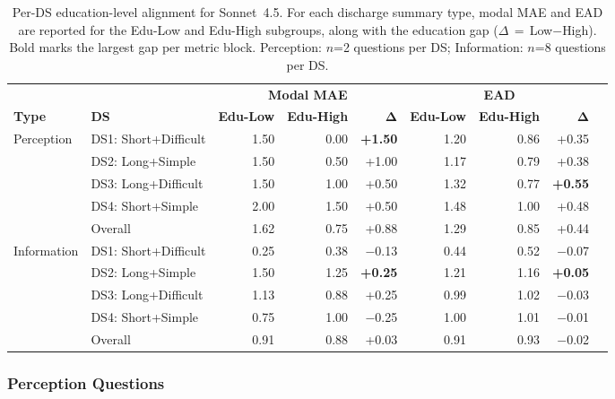 \begin{table}[htbp]
\centering
\scriptsize
\setlength{\tabcolsep}{3.5pt}
\caption{Per-DS education-level alignment for Sonnet~4.5. For each discharge
summary type, modal MAE and EAD are reported for the Edu-Low and Edu-High
subgroups, along with the education gap ($\Delta$\,$=$\,Low$-$High). Bold
marks the largest gap per metric block. Perception: $n$=2 questions per DS;
Information: $n$=8 questions per DS.}
\label{tab:ds-edu-gap}
\begin{tabular}{llrrrrrrr}
\toprule
 & & \multicolumn{3}{c}{\textbf{Modal MAE}} & \multicolumn{3}{c}{\textbf{EAD}} \\
\cmidrule(lr){3-5}\cmidrule(lr){6-8}
\textbf{Type} & \textbf{DS}
& \textbf{Edu-Low} & \textbf{Edu-High} & $\boldsymbol{\Delta}$
& \textbf{Edu-Low} & \textbf{Edu-High} & $\boldsymbol{\Delta}$ \\
\midrule
Perception
& DS1: Short+Difficult & 1.50 & 0.00 & \textbf{+1.50} & 1.20 & 0.86 & +0.35 \\
& DS2: Long+Simple     & 1.50 & 0.50 & +1.00           & 1.17 & 0.79 & +0.38 \\
& DS3: Long+Difficult  & 1.50 & 1.00 & +0.50           & 1.32 & 0.77 & \textbf{+0.55} \\
& DS4: Short+Simple    & 2.00 & 1.50 & +0.50           & 1.48 & 1.00 & +0.48 \\
\cmidrule(lr){2-8}
& Overall              & 1.62 & 0.75 & +0.88           & 1.29 & 0.85 & +0.44 \\
\midrule
Information
& DS1: Short+Difficult & 0.25 & 0.38 & $-$0.13 & 0.44 & 0.52 & $-$0.07 \\
& DS2: Long+Simple     & 1.50 & 1.25 & \textbf{+0.25}  & 1.21 & 1.16 & \textbf{+0.05} \\
& DS3: Long+Difficult  & 1.13 & 0.88 & +0.25         & 0.99 & 1.02 & $-$0.03 \\
& DS4: Short+Simple    & 0.75 & 1.00 & $-$0.25         & 1.00 & 1.01 & $-$0.01 \\
\cmidrule(lr){2-8}
& Overall              & 0.91 & 0.88 & +0.03           & 0.91 & 0.93 & $-$0.02 \\
\bottomrule
\end{tabular}
\end{table}

\subsubsection{Perception Questions}

